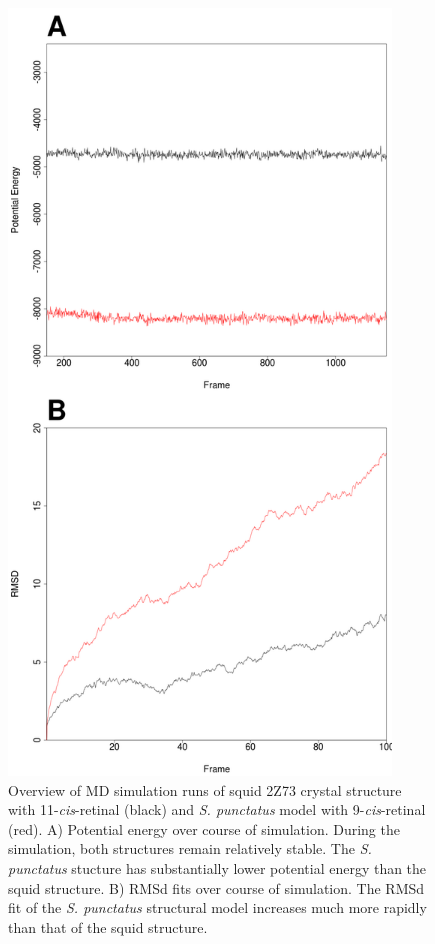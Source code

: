 \begin{figure}[hb]
  \centering
  \includegraphics[width=4in]{./Chapter_RhodStruct/img/TpSp_mdoutRMS.png}
  \caption[MD analysis]{Overview of MD simulation runs of squid 2Z73 crystal structure with 11-\textit{cis}-retinal (black) and \textit{S. punctatus} model with 9-\textit{cis}-retinal (red). A) Potential energy over course of simulation. During the simulation, both structures remain relatively stable. The \textit{S. punctatus} stucture has substantially lower potential energy than the squid structure. B) RMSd fits over course of simulation. The RMSd fit of the \textit{S. punctatus} structural model increases much more rapidly than that of the squid structure.}
  \label{fig:ChRhodS_MDEnergyRMSD}
\end{figure}
